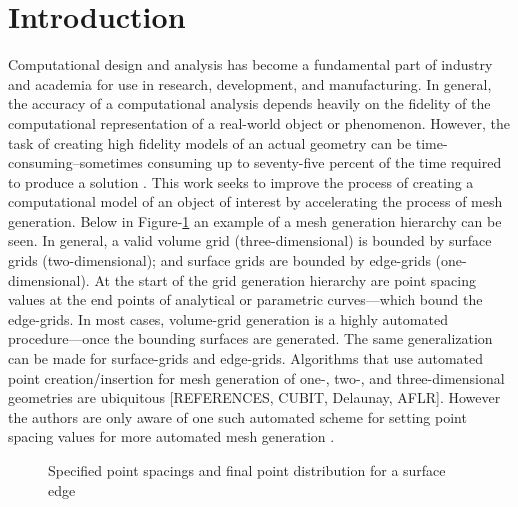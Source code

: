 \documentclass[preprint,12pt]{elsarticle}
\begin{document}


\section{Introduction}Computational design and analysis has become a fundamental part of industry and academia for use in research, development, and manufacturing. In general, the accuracy of a computational analysis depends heavily on the fidelity of the computational representation of a real-world object or phenomenon. However, the task of creating high fidelity models of an actual geometry can be time-consuming--sometimes consuming up to seventy-five percent of the time required to produce a solution \cite{bischoff05}. This work seeks to improve the process of creating a computational model of an object of interest by accelerating the process of mesh generation. Below in Figure-\ref{GridGenerationProcess} an example of a mesh generation hierarchy can be seen. In general, a valid volume grid (three-dimensional) is bounded by surface grids (two-dimensional); and surface grids are bounded by edge-grids (one-dimensional). At the start of the grid generation hierarchy are point spacing values at the end points of analytical or parametric curves—which bound the edge-grids. In most cases, volume-grid generation is a highly automated procedure—once the bounding surfaces are generated. The same generalization can be made for surface-grids and edge-grids. Algorithms that use automated point creation/insertion for mesh generation of one-, two-, and three-dimensional geometries are ubiquitous [REFERENCES, CUBIT, Delaunay, AFLR]. However the authors are only aware of one such automated scheme for setting point spacing values for more automated mesh generation \cite{mclaurin12}.\\

\begin{figure}[h!]
 \caption{\label{GridGenerationProcess} Specified point spacings and final point distribution for a surface edge \cite{thompson98}}
\end{figure}
\end{document}
